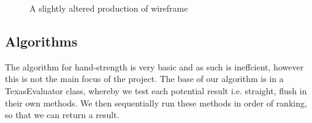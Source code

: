 \documentclass[11pt]{article}
\begin{document}
\begin{figure}[h]
	
	\caption{A slightly altered production of wireframe}
	
\end{figure}



\subsection{Algorithms}

The algorithm for hand-strength is very basic and as such is ineffcient, however this is not the main focus of the project. The base of our algorithm is in a TexasEvaluator class, whereby we test each potential result i.e. straight, flush in their own methods. We then sequentially run these methods in order of ranking, so that we can return a result. 
\end{document}
